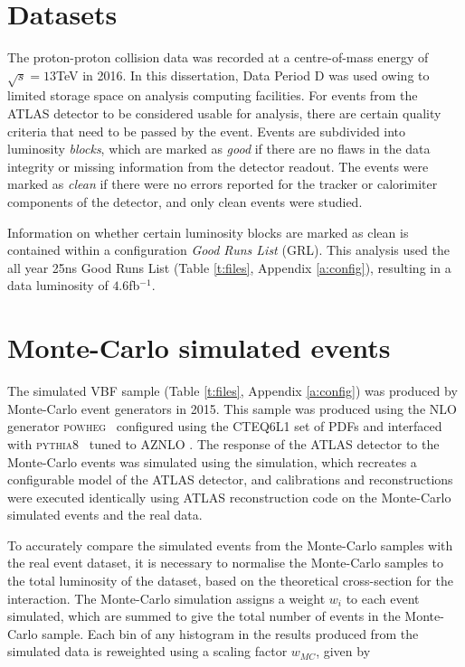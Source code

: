 	\section{Datasets}

	The proton-proton collision data was recorded at a centre-of-mass energy of $\sqrt{s}=13$TeV in 2016. In this dissertation, Data Period D was used owing to limited storage space on analysis computing facilities. For events from the ATLAS detector to be considered usable for analysis, there are certain quality criteria that need to be passed by the event. Events are subdivided into luminosity \textit{blocks}, which are marked as \textit{good} if there are no flaws in the data integrity or missing information from the detector readout. The events were marked as \textit{clean} if there were no errors reported for the tracker or calorimiter components of the detector, and only clean events were studied.

	Information on whether certain luminosity blocks are marked as clean is contained within a configuration \textit{Good Runs List} (GRL). This analysis used the all year 25ns Good Runs List (Table \ref{t:files}, Appendix \ref{a:config}), resulting in a data luminosity of $4.6$fb$^{-1}$.

	\section{Monte-Carlo simulated events}

		 The simulated VBF sample (Table \ref{t:files}, Appendix \ref{a:config}) was produced by Monte-Carlo event generators in 2015. This sample was produced using the NLO generator \textsc{powheg}~\cite{powheg} configured using the CTEQ6L1 \cite{CTEQ} set of PDFs and interfaced with \textsc{pythia8}~\cite{pythia} tuned to AZNLO \cite{AZNLO}. The response of the ATLAS detector to the Monte-Carlo events was simulated using the  \cite{geant4, geant4atlas} simulation, which recreates a configurable model of the ATLAS detector, and calibrations and reconstructions were executed identically using ATLAS reconstruction code on the Monte-Carlo simulated events and the real  data.

		 To accurately compare the simulated events from the Monte-Carlo samples with the real event dataset, it is necessary to normalise the Monte-Carlo samples to the total luminosity of the dataset, based on the theoretical cross-section for the interaction. The Monte-Carlo simulation assigns a weight $w_i$ to each event simulated, which are summed to give the total number of events in the Monte-Carlo sample. Each bin of any histogram in the results produced from the simulated data is reweighted using a scaling factor $w_{MC}$, given by

